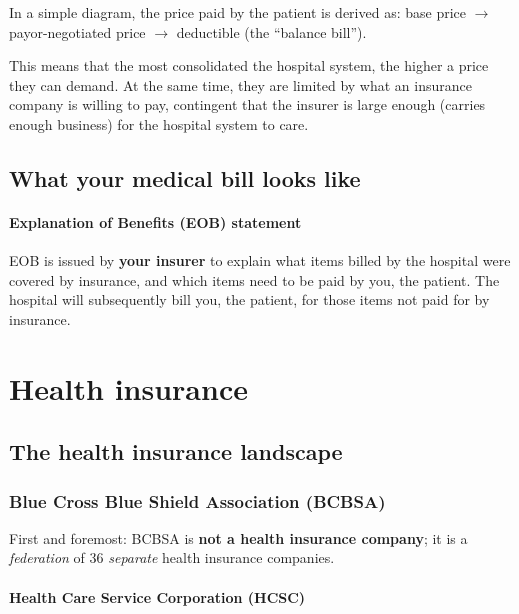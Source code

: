 \documentclass{article}
\begin{document}
In a simple diagram, the price paid by the patient is derived as: base price $\rightarrow$ payor-negotiated price $\rightarrow$ deductible (the ``balance bill'').

This means that the most consolidated the hospital system, the higher a price they can demand. At the same time, they are limited by what an insurance company is willing to pay, contingent that the insurer is large enough (carries enough business) for the hospital system to care.

\subsection{What your medical bill looks like}

\paragraph{Explanation of Benefits (EOB) statement}  EOB is issued by {\bf your insurer} to explain what items billed by the hospital were covered by insurance, and which items need to be paid by you, the patient. The hospital will subsequently bill you, the patient, for those items not paid for by insurance.


\section{Health insurance}

\subsection{The health insurance landscape}

\subsubsection{Blue Cross Blue Shield Association (BCBSA)}

First and foremost: BCBSA is {\bf not a health insurance company}; it is a {\it federation} of 36 {\it separate} health insurance companies.

\paragraph{Health Care Service Corporation (HCSC)}
\end{document}
